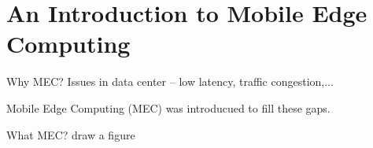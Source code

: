 \section{An Introduction to Mobile Edge Computing}  \label{intro}


Why MEC? Issues in data center -- low latency, traffic congestion,...

Mobile Edge Computing (MEC) was introducued to fill these gaps.

What MEC? draw a figure
